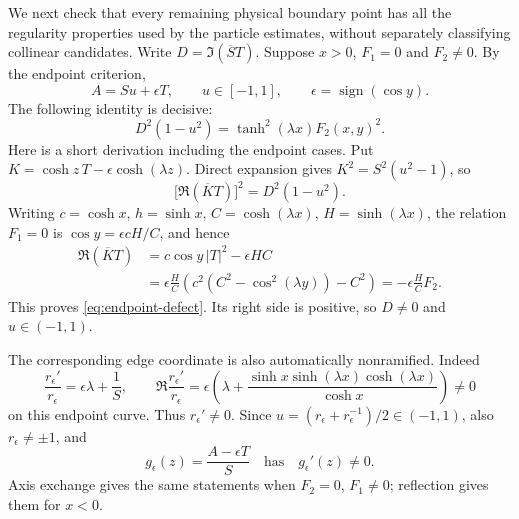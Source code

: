 \documentclass[11pt]{article}
\numberwithin{equation}{section}
\theoremstyle{definition}
\begin{document}
We next check that every remaining physical boundary point has all
the regularity properties used by the particle estimates, without
separately classifying collinear candidates.
Write $D=\Im(\overline S T)$.
Suppose $x>0$, $F_1=0$ and $F_2\ne0$.  By the endpoint criterion,
\begin{equation}\label{eq:endpointrepresentation}
 A=Su+\epsilon T,\qquad
 u\in[-1,1],\qquad \epsilon=\operatorname{sign}(\cos y).
\end{equation}
The following identity is decisive:
\begin{equation}\label{eq:endpoint-defect}
 D^2(1-u^2)=\tanh^2(\lambda x)F_2(x,y)^2.
\end{equation}
Here is a short derivation including the endpoint cases.
Put $K=\cosh z\,T-\epsilon\cosh(\lambda z)$.
Direct expansion gives $K^2=S^2(u^2-1)$, so
\[
 \bigl[\Re(\overline K T)\bigr]^2=D^2(1-u^2).
\]
Writing $c=\cosh x$, $h=\sinh x$,
$C=\cosh(\lambda x)$, $H=\sinh(\lambda x)$,
the relation $F_1=0$ is $\cos y=\epsilon cH/C$, and hence
\begin{align*}
 \Re(\overline K T)
 &=c\cos y\,|T|^2-\epsilon HC\\
 &=\epsilon\frac HC\left(c^2(C^2-\cos^2(\lambda y))-C^2\right)
 =-\epsilon\frac HC F_2.
\end{align*}
This proves \eqref{eq:endpoint-defect}.  Its right side is positive,
so $D\ne0$ and $u\in(-1,1)$.

The corresponding edge coordinate is also automatically nonramified.
Indeed
\[
 \frac{r_\epsilon'}{r_\epsilon}=\epsilon\lambda+\frac1S,
 \qquad
 \Re\frac{r_\epsilon'}{r_\epsilon}
     =\epsilon\left(\lambda+
        \frac{\sinh x\sinh(\lambda x)\cosh(\lambda x)}{\cosh x}\right)
     \ne0
\]
on this endpoint curve.  Thus $r_\epsilon'\ne0$.
Since $u=(r_\epsilon+r_\epsilon^{-1})/2\in(-1,1)$,
also $r_\epsilon\ne\pm1$, and
\[
 g_\epsilon(z)=\frac{A-\epsilon T}{S}
 \quad\text{has}\quad g_\epsilon'(z)\ne0.
\]
Axis exchange gives the same statements when $F_2=0$, $F_1\ne0$;
reflection gives them for $x<0$.
\end{document}
